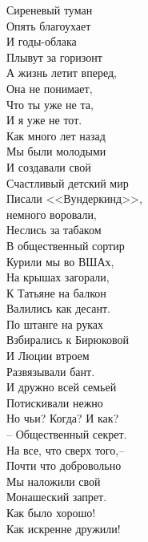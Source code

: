 \begin{multicols}{2}

\itshape
    
    \noindent
    Сиреневый туман \\
    Опять благоухает \\
    И годы-облака \\
    Плывут за горизонт \\
    \vfill
    \columnbreak
    \noindent
    А жизнь летит вперед,\\
    Она не понимает,\\
    Что ты уже не та,\\
    И я уже не тот. \\
    \vfill
    \columnbreak
    \noindent
    Как много лет назад\\
    Мы были молодыми\\
    И создавали свой\\
    Счастливый детский мир\\
    \vfill
    \noindent
    Писали <<Вундеркинд>>,\\
    немного воровали,\\
    Неслись за табаком\\
    В общественный сортир\\
    \vfill
    \noindent
    Курили мы во ВШАх,\\
    На крышах загорали,\\
    К Татьяне на балкон\\
    Валились как десант.\\
    \vfill   
    \noindent 
    По штанге на руках\\
    Взбирались к Бирюковой\\
    И Люции втроем\\
    Развязывали бант.\\
    \vfill
    \noindent
    И дружно всей семьей\\
    Потискивали нежно\\
    Но чьи? Когда? И как?\\
    -- Общественный секрет.\\
    \vfill
    \noindent
    На все, что сверх того,--\\
    Почти что добровольно\\
    Мы наложили свой \\
    Монашеский запрет.\\
    \vfill
    \noindent
    Как было хорошо!\\
    Как искренне дружили!\\

\end{multicols}
